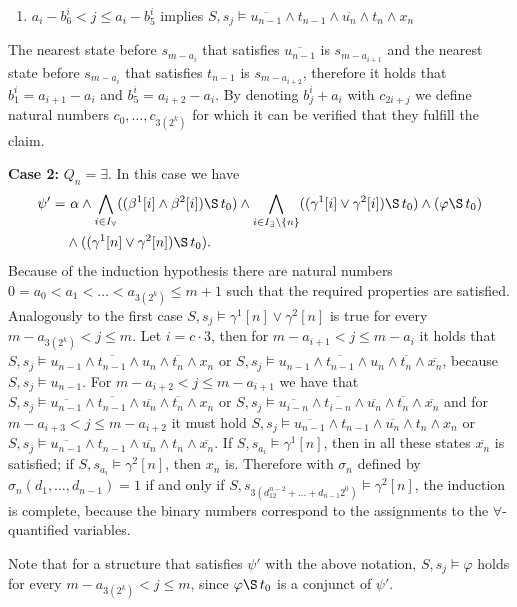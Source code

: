 \begin{EcoEnum}
\begin{enumerate}[$\bullet$]
              \item $a_{i}-b^i_6< j\leq a_{i}-b^i_5$ implies $S,s_j\vDash \overline{u_{n-1}}\wedge t_{n-1}\wedge\overline{u_n}\wedge t_n\wedge x_n$
            \end{enumerate}
            The nearest state before $s_{m-a_{i}}$ that satisfies $\overline{u_{n-1}}$ is $s_{m-a_{i+1}}$ and the nearest state before $s_{m-a_{i}}$ that satisfies $t_{n-1}$ is $s_{m-a_{i+2}}$, therefore it holds that $b^i_1=a_{i+1}-a_{i}$ and $b^i_5=a_{i+2}-a_{i}$. By denoting $b^i_j+a_i$ with $c_{2i+j}$ we define natural numbers $c_0,\dots,c_{3(2^k)}$ for which it can be verified that they fulfill the claim.

          \item[\textbf{Case 2:}] $Q_n=\exists$. In this case we have
            \begin{equation*}\begin{split}
              \psi'=& \ \alpha\wedge\bigwedge_{i\in I_{\forall}}((\beta^1[i]\wedge\beta^2[i])\S\, t_0)\wedge \bigwedge_{i\in I_{\exists}\setminus\{n\}}((\gamma^1[i]\vee\gamma^2[i])\S\, t_0)\wedge (\varphi \S\, t_0) \\ &\wedge ((\gamma^1[n]\vee\gamma^2[n]) \S\, t_0).
            \end{split}\end{equation*}
          Because of the induction hypothesis there are natural numbers $0=a_0<a_1<\dots<a_{3(2^k)}\leq m+1$ such that the required properties are satisfied. Analogously to the first case $S,s_j\vDash\gamma^1[n]\vee\gamma^2[n]$ is true for every $m-a_{3(2^k)}<j\leq m$. Let $i=c\cdot3$, then for $m-a_{i+1}<j\leq m-a_i$ it holds that $S,s_j\vDash u_{n-1}\wedge\overline{t_{n-1}}\wedge u_n\wedge\overline{t_n}\wedge x_n$ or $S,s_j\vDash u_{n-1}\wedge\overline{t_{n-1}}\wedge u_n\wedge\overline{t_n}\wedge \overline{x_n}$, because $S,s_j\vDash u_{n-1}$. For $m-a_{i+2}<j\leq m-a_{i+1}$ we have that $S,s_j\vDash\overline{u_{n-1}}\wedge\overline{t_{n-1}}\wedge\overline{u_n}\wedge\overline{t_n}\wedge x_n$ or $S,s_j\vDash\overline{u_{i-n}}\wedge\overline{t_{i-n}}\wedge\overline{u_n}\wedge\overline{t_n}\wedge\overline{x_n}$ and for $m-a_{i+3}<j\leq m-a_{i+2}$ it must hold $S,s_j\vDash\overline{u_{n-1}}\wedge t_{n-1}\wedge\overline{u_n}\wedge t_n\wedge x_n$ or $S,s_j\vDash\overline{u_{n-1}}\wedge t_{n-1}\wedge\overline{u_n}\wedge t_n \wedge\overline{x_n}$. If $S,s_{a_i}\vDash\gamma^1[n]$, then in all these states $\overline{x_n}$ is satisfied; if $S,s_{a_i}\vDash\gamma^2[n]$, then $x_n$ is. Therefore with $\sigma_n$ defined by $\sigma_n(d_1,\dots, d_{n-1})=1$ if and only if $S,s_{3(d_12^{n-2}+\dots+d_{n-1}2^0)}\vDash\gamma^2[n]$, the induction is complete, because the binary numbers correspond to the assignments to the $\forall$-quantified variables.
        \end{EcoEnum}
        Note that for a structure that satisfies $\psi'$ with the above notation, $S,s_j\vDash\varphi$ holds for every $m-a_{3(2^k)}<j\leq m$, since $\varphi\S\, t_0$ is a conjunct of $\psi'$.

